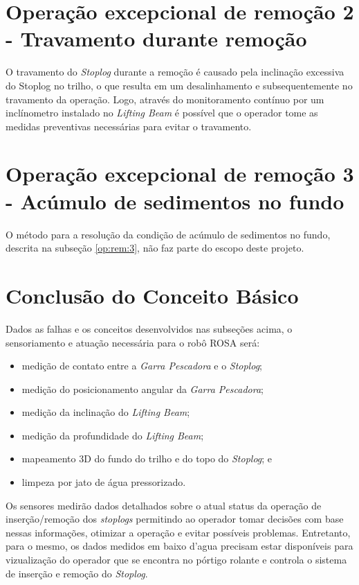 
\section{Operação excepcional de remoção 2 - Travamento durante remoção}

O travamento do \emph{Stoplog} durante a remoção é causado pela inclinação excessiva do Stoplog no trilho, o que resulta em um desalinhamento e subsequentemente no travamento da operação. Logo, através do monitoramento contínuo por um inclínometro instalado no \emph{Lifting Beam} é possível que o operador tome as medidas preventivas necessárias para evitar o travamento.   


\section{Operação excepcional de remoção 3 - Acúmulo de sedimentos no fundo}
O método para a resolução da condição de acúmulo de sedimentos no fundo,
descrita na subseção \ref{op:rem:3}, não faz parte do escopo deste projeto.



\section{Conclusão do Conceito Básico}

Dados as falhas e os conceitos desenvolvidos nas subseções acima, o
sensoriamento e atuação necessária para o robô ROSA será:

\begin{itemize}

	\item medição de contato entre a \emph{Garra Pescadora} e o \emph{Stoplog}; 
	\item medição do posicionamento angular da \emph{Garra Pescadora}; 
	\item medição da inclinação do \emph{Lifting Beam};
	\item medição da profundidade do \emph{Lifting Beam}; 
	\item mapeamento 3D do fundo do trilho e do topo do \emph{Stoplog}; e
	\item limpeza por jato de água pressorizado. 

\end{itemize}

Os sensores medirão dados detalhados sobre o atual status da
operação de inserção/remoção dos \emph{stoplogs} permitindo ao operador tomar decisões
com base nessas informações, otimizar a operação e evitar possíveis problemas.
Entretanto, para o mesmo, os dados medidos em baixo d'agua precisam estar
disponíveis para vizualização do operador que se encontra no pórtigo rolante e controla o sistema de inserção e remoção do \emph{Stoplog}.

